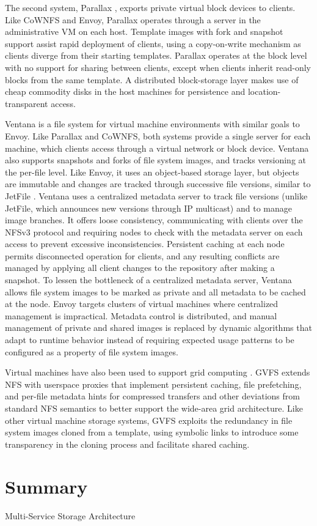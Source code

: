 The second system, Parallax \cite{warfield}, exports private virtual block devices to clients. Like CoWNFS and Envoy, Parallax operates through a server in the administrative VM on each host. Template images with fork and snapshot support assist rapid deployment of clients, using a copy-on-write mechanism as clients diverge from their starting templates. Parallax operates at the block level with no support for sharing between clients, except when clients inherit read-only blocks from the same template. A distributed block-storage layer makes use of cheap commodity disks in the host machines for persistence and location-transparent access.

Ventana \cite{pfaff} is a file system for virtual machine environments with similar goals to Envoy. Like Parallax and CoWNFS, both systems provide a single server for each machine, which clients access through a virtual network or block device. Ventana also supports snapshots and forks of file system images, and tracks versioning at the per-file level. Like Envoy, it uses an object-based storage layer, but objects are immutable and changes are tracked through successive file versions, similar to JetFile \cite{gronvall}. Ventana uses a centralized metadata server to track file versions (unlike JetFile, which announces new versions through IP multicast) and to manage image branches. It offers loose consistency, communicating with clients over the NFSv3 protocol and requiring nodes to check with the metadata server on each access to prevent excessive inconsistencies. Persistent caching at each node permits disconnected operation for clients, and any resulting conflicts are managed by applying all client changes to the repository after making a snapshot. To lessen the bottleneck of a centralized metadata server, Ventana allows file system images to be marked as private and all metadata to be cached at the node. Envoy targets clusters of virtual machines where centralized management is impractical. Metadata control is distributed, and manual management of private and shared images is replaced by dynamic algorithms that adapt to runtime behavior instead of requiring expected usage patterns to be configured as a property of file system images.

Virtual machines have also been used to support grid computing \cite{figueiredo03}. GVFS \cite{zhao04} extends NFS with userspace proxies that implement persistent caching, file prefetching, and per-file metadata hints for compressed transfers and other deviations from standard NFS semantics to better support the wide-area grid architecture. Like other virtual machine storage systems, GVFS exploits the redundancy in file system images cloned from a template, using symbolic links to introduce some transparency in the cloning process and facilitate shared caching.

\section{Summary}

Multi-Service Storage Architecture \cite{bacon}